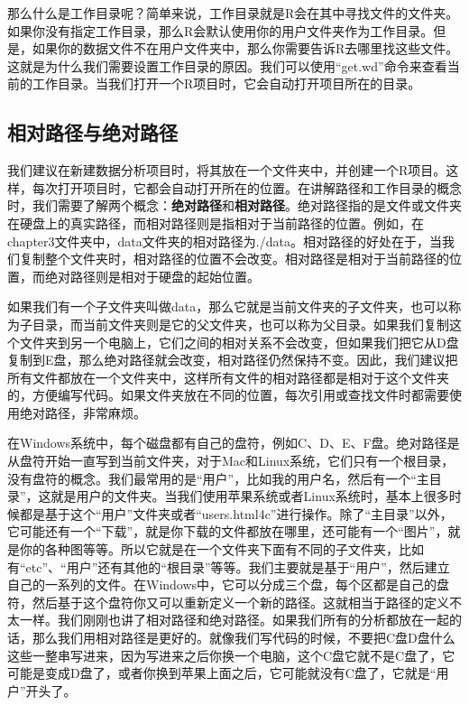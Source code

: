 \documentclass[
  oneside]{book}
\begin{document}
那么什么是工作目录呢？简单来说，工作目录就是R会在其中寻找文件的文件夹。如果你没有指定工作目录，那么R会默认使用你的用户文件夹作为工作目录。但是，如果你的数据文件不在用户文件夹中，那么你需要告诉R去哪里找这些文件。这就是为什么我们需要设置工作目录的原因。我们可以使用``get.wd''命令来查看当前的工作目录。当我们打开一个R项目时，它会自动打开项目所在的目录。

\hypertarget{ux76f8ux5bf9ux8defux5f84ux4e0eux7eddux5bf9ux8defux5f84}{%
\subsection{相对路径与绝对路径}\label{ux76f8ux5bf9ux8defux5f84ux4e0eux7eddux5bf9ux8defux5f84}}

我们建议在新建数据分析项目时，将其放在一个文件夹中，并创建一个R项目。这样，每次打开项目时，它都会自动打开所在的位置。在讲解路径和工作目录的概念时，我们需要了解两个概念：\textbf{绝对路径}和\textbf{相对路径}。绝对路径指的是文件或文件夹在硬盘上的真实路径，而相对路径则是指相对于当前路径的位置。例如，在chapter3文件夹中，data文件夹的相对路径为./data。相对路径的好处在于，当我们复制整个文件夹时，相对路径的位置不会改变。相对路径是相对于当前路径的位置，而绝对路径则是相对于硬盘的起始位置。

如果我们有一个子文件夹叫做data，那么它就是当前文件夹的子文件夹，也可以称为子目录，而当前文件夹则是它的父文件夹，也可以称为父目录。如果我们复制这个文件夹到另一个电脑上，它们之间的相对关系不会改变，但如果我们把它从D盘复制到E盘，那么绝对路径就会改变，相对路径仍然保持不变。因此，我们建议把所有文件都放在一个文件夹中，这样所有文件的相对路径都是相对于这个文件夹的，方便编写代码。如果文件夹放在不同的位置，每次引用或查找文件时都需要使用绝对路径，非常麻烦。

在Windows系统中，每个磁盘都有自己的盘符，例如C、D、E、F盘。绝对路径是从盘符开始一直写到当前文件夹，对于Mac和Linux系统，它们只有一个根目录，没有盘符的概念。我们最常用的是``用户''，比如我的用户名，然后有一个``主目录''，这就是用户的文件夹。当我们使用苹果系统或者Linux系统时，基本上很多时候都是基于这个``用户''文件夹或者``users.html4c''进行操作。除了``主目录''以外，它可能还有一个``下载''，就是你下载的文件都放在哪里，还可能有一个``图片''，就是你的各种图等等。所以它就是在一个文件夹下面有不同的子文件夹，比如有``etc''、``用户''还有其他的``根目录''等等。我们主要就是基于``用户''，然后建立自己的一系列的文件。在Windows中，它可以分成三个盘，每个区都是自己的盘符，然后基于这个盘符你又可以重新定义一个新的路径。这就相当于路径的定义不太一样。我们刚刚也讲了相对路径和绝对路径。如果我们所有的分析都放在一起的话，那么我们用相对路径是更好的。就像我们写代码的时候，不要把C盘D盘什么这些一整串写进来，因为写进来之后你换一个电脑，这个C盘它就不是C盘了，它可能是变成D盘了，或者你换到苹果上面之后，它可能就没有C盘了，它就是``用户''开头了。
\end{document}
